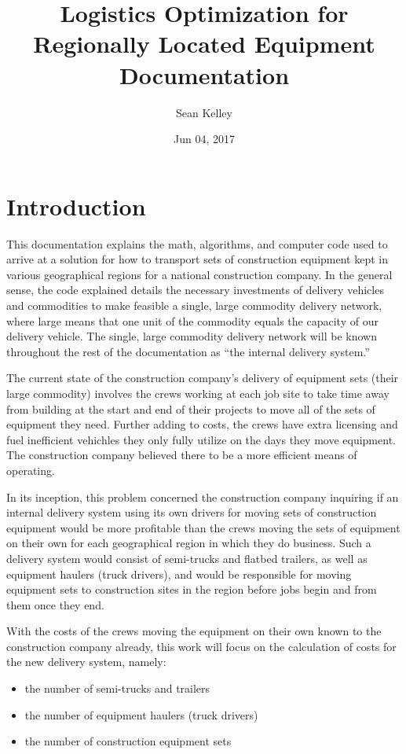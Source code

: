 \documentclass[letterpaper,10pt,english]{sphinxmanual}
\title{Logistics Optimization for Regionally Located Equipment Documentation}
\date{Jun 04, 2017}
\author{Sean Kelley}
\begin{document}
\maketitle
\sphinxtableofcontents
{}\label{\detokenize{index::doc}}



\chapter{Introduction}
\label{\detokenize{introduction:introduction}}\label{\detokenize{introduction::doc}}\label{\detokenize{introduction:contents}}\label{\detokenize{introduction:id1}}
This documentation explains the math, algorithms, and computer code used to
arrive at a solution for how to transport sets of construction equipment kept
in various geographical regions for a national construction company. In the
general sense, the code explained details the necessary investments of
delivery vehicles and commodities to make feasible a single, large commodity
delivery network, where large means that one unit of the commodity equals the
capacity of our delivery vehicle. The single, large commodity delivery network
will be known throughout the rest of the documentation as ``the internal
delivery system.''

The current state of the construction company's delivery of equipment sets
(their large commodity) involves the crews working at each job site to take time
away from building at the start and end of their projects to move all of the
sets of equipment they need. Further adding to costs, the crews have extra
licensing and fuel inefficient vehichles they only fully utilize on the days
they move equipment. The construction company believed there to be a more
efficient means of operating.

In its inception, this problem concerned the construction
company inquiring if an internal delivery system using its own drivers for
moving sets of construction equipment would be more profitable than the crews
moving the sets of equipment on their own for each geographical region in
which they do business. Such a delivery system would consist of semi-trucks
and flatbed trailers, as well as equipment haulers (truck drivers), and would
be responsible for moving equipment sets to construction sites in the region
before jobs begin and from them once they end.

With the costs of the crews moving the equipment on their own known to the
construction company already, this work will focus on the calculation of
costs for the new delivery system, namely:
\begin{itemize}
\item {} 
the number of semi-trucks and trailers

\item {} 
the number of equipment haulers (truck drivers)

\item {} 
the number of construction equipment sets

\end{itemize}
\end{document}
